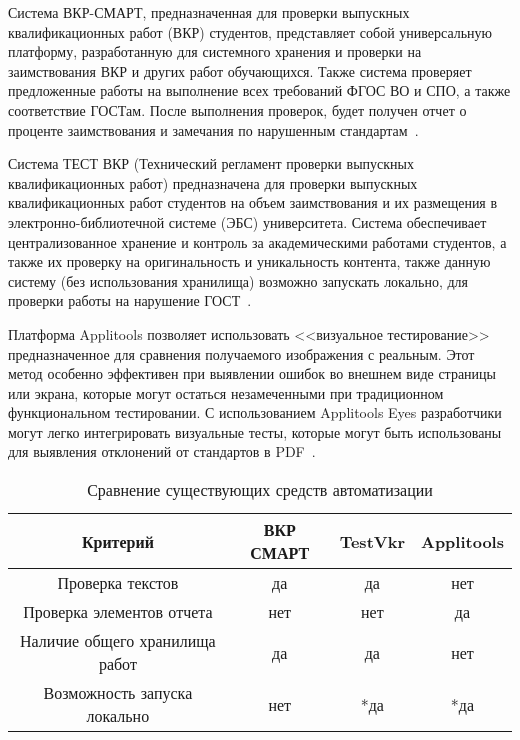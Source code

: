 Система ВКР-СМАРТ, предназначенная для проверки выпускных квалификационных работ (ВКР) студентов, представляет собой универсальную платформу, разработанную для системного хранения и проверки на заимствования ВКР и других работ обучающихся. Также система проверяет предложенные работы на выполнение всех требований ФГОС ВО и СПО, а также соответствие ГОСТам. После выполнения проверок, будет получен отчет о проценте заимствования и замечания по нарушенным стандартам~\cite{VKR_VYZ}.

Система ТЕСТ ВКР (Технический регламент проверки выпускных квалификационных работ) предназначена для проверки выпускных квалификационных работ студентов на объем заимствования и их размещения в электронно-библиотечной системе (ЭБС) университета. Система обеспечивает централизованное хранение и контроль за академическими работами студентов, а также их проверку на оригинальность и уникальность контента, также данную систему (без использования хранилища) возможно запускать локально, для проверки работы на нарушение ГОСТ~\cite{TestVkr}.

Платформа Applitools позволяет использовать <<визуальное тестирование>> предназначенное для сравнения получаемого изображения с реальным. Этот метод особенно эффективен при выявлении ошибок во внешнем виде страницы или экрана, которые могут остаться незамеченными при традиционном функциональном тестировании. С использованием Applitools Eyes разработчики могут легко интегрировать визуальные тесты, которые могут быть использованы для выявления отклонений от стандартов в PDF~\cite{PdfTest}.



\begin{table}[ht]
	\begin{center}
		\begin{threeparttable}
			\caption{\label{t:cmp} Сравнение существующих средств автоматизации}
			\begin{tabular}{|c|c|c|c|}
				\hline
				\textbf{Критерий} & \textbf{ВКР СМАРТ} & \textbf{TestVkr} & \textbf{Applitools} \\ \hline
				Проверка текстов  & да & да & нет\\ \hline
				Проверка элементов отчета & нет & нет & да \\ \hline
				Наличие общего хранилища работ  & да & да & нет \\ \hline
				Возможность запуска локально & нет & *да & *да \\ \hline
			\end{tabular}
		\end{threeparttable}
	\end{center}
\end{table}


